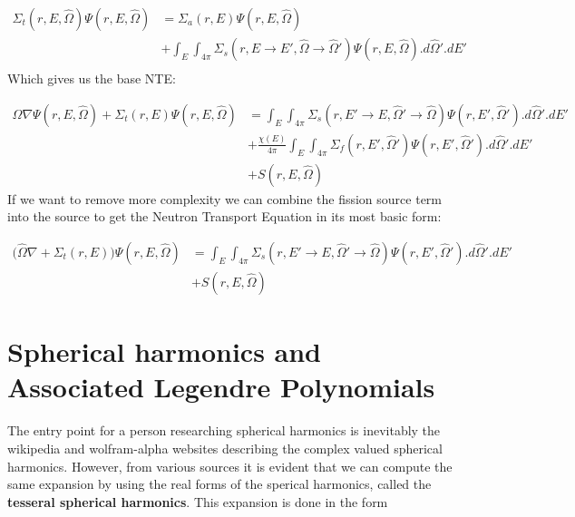 \documentclass[11pt,letterpaper,titlepage]{article}
\numberwithin{equation}{section}
\begin{document}
\begin{equation*}
\begin{aligned}
\Sigma_t (r,E,\hat{\Omega})\Psi(r,E,\hat{\Omega}) &=  \Sigma_a (r,E)\Psi(r,E,\hat{\Omega})\\
&+  \int_E \int_{4\pi} 
\Sigma_s (r,E{\to} E',\hat{\Omega} {\to} \hat{\Omega}') \Psi (r,E,\hat{\Omega}) 
.d\hat{\Omega}'.dE'\\
\end{aligned}
\end{equation*}
\newline
Which gives us the base NTE:

\begin{equation}
\begin{aligned}
\hat{\Omega}\nabla \Psi (r,E,\hat{\Omega}) 
+\Sigma_t (r,E)\Psi(r,E,\hat{\Omega})
&=  \int_E \int_{4\pi}
\Sigma_s (r,E'{\to} E,\hat{\Omega}' {\to} \hat{\Omega}) \Psi (r,E',\hat{\Omega}') 
.d\hat{\Omega}'.dE'\\
&+\frac{\chi (E)}{4\pi} 
  \int_E \int_{4\pi} 
\Sigma_f (r,E',\hat{\Omega}') \Psi (r,E',\hat{\Omega}') 
.d\hat{\Omega}'.dE'\\
&+ S(r,E,\hat{\Omega})
\end{aligned}
\end{equation}
\newline
\newline
If we want to remove more complexity we can combine the fission source term into the source to get the Neutron Transport Equation in its most basic form:

\begin{equation} \label{eq:baseNTE}
\begin{aligned}
\biggr(\hat{\Omega}\nabla +\Sigma_t (r,E)\biggr) \Psi(r,E,\hat{\Omega})
&=  \int_E \int_{4\pi}
\Sigma_s (r,E'{\to} E,\hat{\Omega}' {\to} \hat{\Omega}) \Psi (r,E',\hat{\Omega}') 
.d\hat{\Omega}'.dE'\\
&+ S(r,E,\hat{\Omega})
\end{aligned}
\end{equation}

\newpage
{}
\section{Spherical harmonics and Associated Legendre Polynomials}
The entry point for a person researching spherical harmonics is inevitably the wikipedia and wolfram-alpha websites describing the complex valued spherical harmonics. However, from various sources it is evident that we can compute the same expansion by using the real forms of the sperical harmonics, called the \textbf{tesseral spherical harmonics}. This expansion is done in the form
\end{document}
